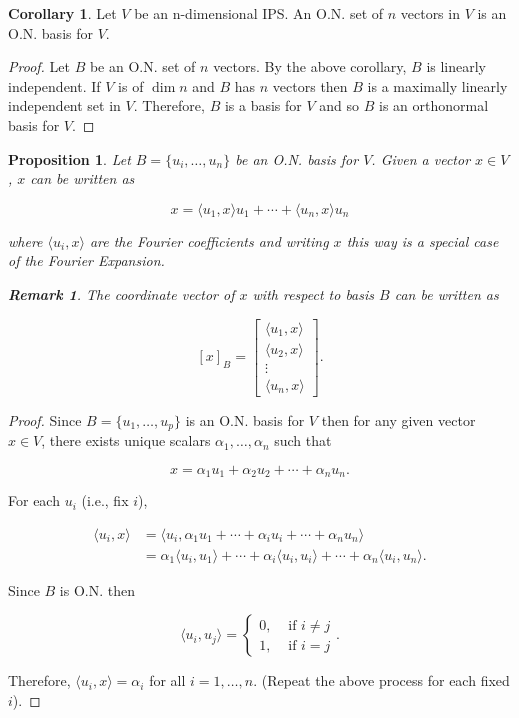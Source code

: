 \documentclass[12pt]{article}
\newtheorem*{proposition}{Proposition}
\theoremstyle{definition}
\newtheorem*{corollary}{Corollary}
\newtheorem*{remark}{Remark}
\begin{document}
\begin{corollary}
Let $V$ be an n-dimensional IPS. An O.N. set of $n$ vectors in $V$ is an O.N. basis
for $V$.
\end{corollary}

\begin{proof}
Let $B$ be an O.N. set of $n$ vectors. By the above corollary, $B$ is linearly
independent. If $V$ is of $\dim{n}$ and $B$ has $n$ vectors then $B$ is a maximally
linearly independent set in $V$. Therefore, $B$ is a basis for $V$ and so $B$ is
an orthonormal basis for $V$.
\end{proof}

\begin{proposition}
Let $B = \{u_i, \ldots, u_n\}$ be an O.N. basis for $V$. Given a vector $x \in V$,
$x$ can be written as

\[x = \langle u_1, x \rangle u_1 + \cdots + \langle u_n, x \rangle u_n \]

where $\langle u_i, x \rangle$ are the Fourier coefficients and writing $x$ this
way is a special case of the Fourier Expansion.

\begin{remark}
The coordinate vector of $x$ with respect to basis $B$ can be written as

\[ [x]_B = 
\begin{bmatrix}
\langle u_1, x \rangle \\
\langle u_2, x \rangle \\
\vdots \\
\langle u_n, x \rangle
\end{bmatrix}.
\]
\end{remark}
\end{proposition}

\begin{proof}
Since $B = \{u_1, \ldots, u_p \}$ is an O.N. basis for $V$ then for any given vector
$x \in V$, there exists unique scalars $\alpha_1, \ldots, \alpha_n$ such that

\[ x = \alpha_1 u_1 + \alpha_2 u_2 + \cdots + \alpha_n u_n. \]

For each $u_i$ (i.e., fix $i$),

\begin{align*}
\langle u_i, x \rangle &= \langle u_i, \alpha_1 u_1 + \cdots + \alpha_i u_i + \cdots
+ \alpha_n u_n \rangle \\
&= \alpha_1 \langle u_i, u_1 \rangle + \cdots + \alpha_i \langle u_i, u_i \rangle +
\cdots + \alpha_n \langle u_i, u_n \rangle.
\end{align*}

Since $B$ is O.N. then

\[
\langle u_i, u_j \rangle =
\begin{cases}
0, & \text{ if } i \neq j \\
1, & \text{ if } i = j
\end{cases}.
\]

Therefore, $\langle u_i, x \rangle = \alpha_i$ for all $i = 1, \ldots, n$. (Repeat the
above process for each fixed $i$).

\end{proof}
\end{document}
